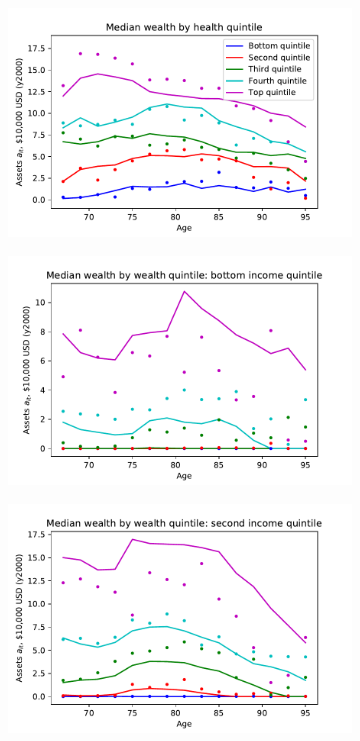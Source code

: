 \documentclass[12pt,pdftex,letterpaper]{article}
\begin{document}
\begin{figure}[h!]
   \centering
   \begin{subfigure}[b]{0.49\textwidth}
      \centering
      \includegraphics[width=\textwidth]{../Figures/WealthByHealthAge.pdf}
   \end{subfigure}
   \begin{subfigure}[b]{0.49\textwidth}
      \centering
      \includegraphics[width=\textwidth]{../Figures/WealthByIncWealthAge1.pdf}
   \end{subfigure}
   \begin{subfigure}[b]{0.49\textwidth}
      \centering
      \includegraphics[width=\textwidth]{../Figures/WealthByIncWealthAge2.pdf}

\end{subfigure}
\end{figure}
\end{document}
